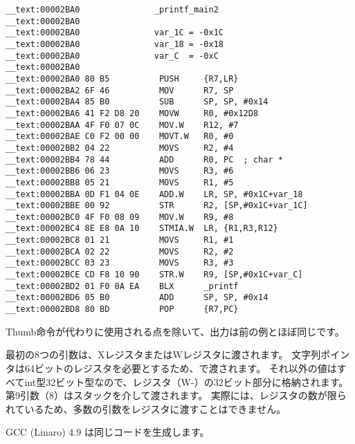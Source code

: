 \begin{lstlisting}[style=customasmARM]
__text:00002BA0               _printf_main2
__text:00002BA0
__text:00002BA0               var_1C = -0x1C
__text:00002BA0               var_18 = -0x18
__text:00002BA0               var_C  = -0xC
__text:00002BA0
__text:00002BA0 80 B5          PUSH     {R7,LR}
__text:00002BA2 6F 46          MOV      R7, SP
__text:00002BA4 85 B0          SUB      SP, SP, #0x14
__text:00002BA6 41 F2 D8 20    MOVW     R0, #0x12D8
__text:00002BAA 4F F0 07 0C    MOV.W    R12, #7
__text:00002BAE C0 F2 00 00    MOVT.W   R0, #0
__text:00002BB2 04 22          MOVS     R2, #4
__text:00002BB4 78 44          ADD      R0, PC  ; char *
__text:00002BB6 06 23          MOVS     R3, #6
__text:00002BB8 05 21          MOVS     R1, #5
__text:00002BBA 0D F1 04 0E    ADD.W    LR, SP, #0x1C+var_18
__text:00002BBE 00 92          STR      R2, [SP,#0x1C+var_1C]
__text:00002BC0 4F F0 08 09    MOV.W    R9, #8
__text:00002BC4 8E E8 0A 10    STMIA.W  LR, {R1,R3,R12}
__text:00002BC8 01 21          MOVS     R1, #1
__text:00002BCA 02 22          MOVS     R2, #2
__text:00002BCC 03 23          MOVS     R3, #3
__text:00002BCE CD F8 10 90    STR.W    R9, [SP,#0x1C+var_C]
__text:00002BD2 01 F0 0A EA    BLX      _printf
__text:00002BD6 05 B0          ADD      SP, SP, #0x14
__text:00002BD8 80 BD          POP      {R7,PC}
\end{lstlisting}

Thumb命令が代わりに使用される点を除いて、出力は前の例とほぼ同じです。





最初の8つの引数は、XレジスタまたはWレジスタに渡されます。 \ARMPCS
文字列ポインタは64ビットのレジスタを必要とするため、で渡されます。 
それ以外の値はすべてint型32ビット型なので、レジスタ（W-）の32ビット部分に格納されます。 
第9引数（8）はスタックを介して渡されます。 
実際には、レジスタの数が限られているため、多数の引数をレジスタに渡すことはできません。

\Optimizing GCC (Linaro) 4.9 は同じコードを生成します。
